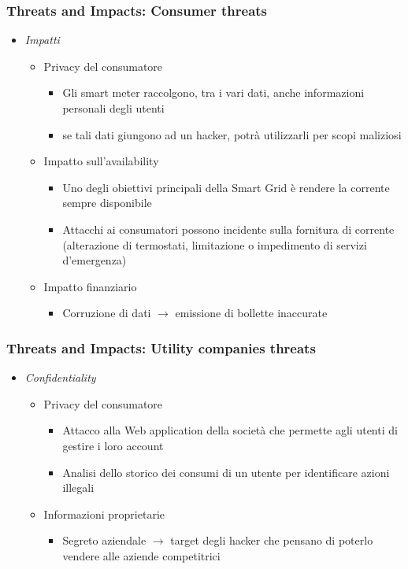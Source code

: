 \begin{frame}
  \frametitle{Threats and Impacts: Consumer threats}
  \begin{itemize}[<+- | alert@+>]
  \item \textit{Impatti}
	\begin{itemize}
	\item Privacy del consumatore
		\begin{itemize}
		\item Gli smart meter raccolgono, tra i vari dati, anche informazioni personali degli utenti
		\item se tali dati giungono ad un hacker, potrà utilizzarli per scopi maliziosi
		\end{itemize}
	\item Impatto sull'availability
			\begin{itemize}
		\item Uno degli obiettivi principali della Smart Grid è rendere la corrente sempre disponibile
		\item Attacchi ai consumatori possono incidente sulla fornitura di corrente (alterazione di termostati, limitazione o impedimento di servizi d'emergenza) 
		\end{itemize}
	\item Impatto finanziario
				\begin{itemize}
		\item Corruzione di dati $\rightarrow$ emissione di bollette inaccurate
		\end{itemize}
  \end{itemize}
  \end{itemize}
\end{frame}

\begin{frame}
  \frametitle{Threats and Impacts: Utility companies threats}
  \begin{itemize}[<+- | alert@+>]
  \item \textit{Confidentiality}
  \begin{itemize}
	  \item Privacy del consumatore
	  \begin{itemize}
	  \item Attacco alla Web application della società che permette agli utenti di gestire i loro account
	  \item Analisi dello storico dei consumi di un utente per identificare azioni illegali
	  \end{itemize}
	\item Informazioni proprietarie
		\begin{itemize}
		\item Segreto aziendale $\rightarrow$ target degli hacker che pensano di poterlo vendere alle aziende competitrici
		\end{itemize}
 	\end{itemize}
 \end{itemize}
\end{frame}

